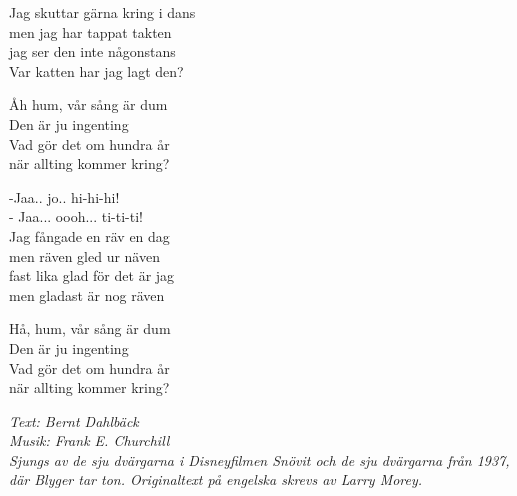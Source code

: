 \vspace{10pt}
Jag skuttar gärna kring i dans\\
men jag har tappat takten\\
jag ser den inte någonstans\\
Var katten har jag lagt den?\par
\vspace{10pt}
Åh hum, vår sång är dum\\
Den är ju ingenting\\
Vad gör det om hundra år\\
när allting kommer kring?\par
\vspace{10pt}
-Jaa.. jo.. hi-hi-hi!\\
- Jaa... oooh... ti-ti-ti!\\
Jag fångade en räv en dag\\
men räven gled ur näven\\
fast lika glad för det är jag\\
men gladast är nog räven\par
\vspace{10pt}
Hå, hum, vår sång är dum\\
Den är ju ingenting\\
Vad gör det om hundra år\\
när allting kommer kring?\par
\vspace{10pt}
{\footnotesize\textit{Text: Bernt Dahlbäck\\ Musik: Frank
E. Churchill\\Sjungs av de sju dvärgarna i Disneyfilmen Snövit och de
sju dvärgarna från 1937, där Blyger tar ton. Originaltext på engelska
skrevs av Larry Morey.}}
